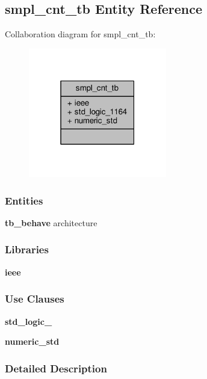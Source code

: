 \subsection{smpl\+\_\+cnt\+\_\+tb Entity Reference}
\label{classsmpl__cnt__tb}


Collaboration diagram for smpl\+\_\+cnt\+\_\+tb\+:\nopagebreak
\begin{figure}[H]
\begin{center}
\leavevmode
\includegraphics[width=171pt]{d5/d5d/classsmpl__cnt__tb__coll__graph}
\end{center}
\end{figure}
\subsubsection*{Entities}
\begin{DoxyCompactItemize}
\item 
{\bf tb\+\_\+behave} architecture
\end{DoxyCompactItemize}
\subsubsection*{Libraries}
 \begin{DoxyCompactItemize}
\item 
{\bf ieee} 
\end{DoxyCompactItemize}
\subsubsection*{Use Clauses}
 \begin{DoxyCompactItemize}
\item 
{\bf std\+\_\+logic\+\_}   
\item 
{\bf numeric\+\_\+std}   
\end{DoxyCompactItemize}


\subsubsection{Detailed Description}



